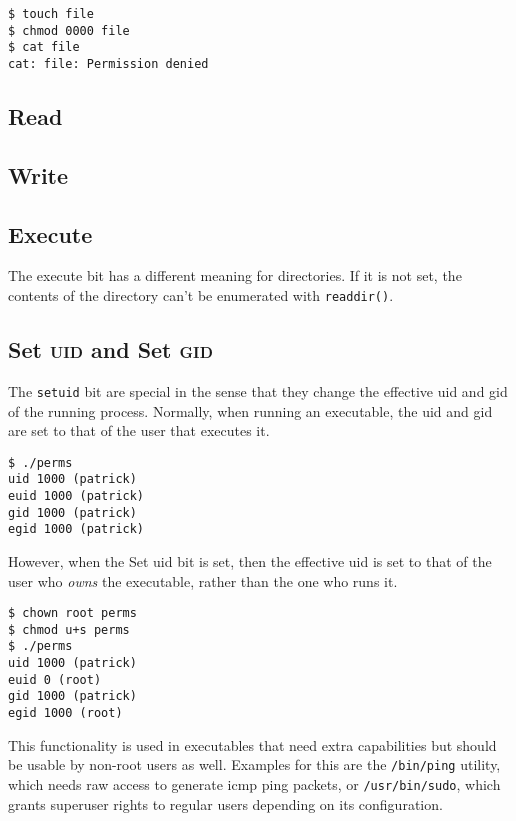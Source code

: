 \documentclass[a4paper]{article}
\begin{document}
\begin{verbatim}
$ touch file
$ chmod 0000 file
$ cat file
cat: file: Permission denied
\end{verbatim}

\subsection{Read}

\subsection{Write}

\subsection{Execute}

The execute bit has a different meaning for directories. If it is not set, the contents of the directory can't be enumerated with \verb|readdir()|. 

\subsection{Set \textsc{uid} and Set \textsc{gid}}

The \verb|setuid| bit are special in the sense that they change the effective \gls{uid} and \gls{gid} of the running process. Normally, when running an executable, the \gls{uid} and \gls{gid} are set to that of the user that executes it.

\begin{verbatim}
$ ./perms
uid 1000 (patrick)
euid 1000 (patrick)
gid 1000 (patrick)
egid 1000 (patrick)  
\end{verbatim}

However, when the Set \gls{uid} bit is set, then the effective \gls{uid} is set to that of the user who \emph{owns} the executable, rather than the one who runs it.

\begin{verbatim}
$ chown root perms
$ chmod u+s perms
$ ./perms
uid 1000 (patrick)
euid 0 (root)
gid 1000 (patrick)
egid 1000 (root)  
\end{verbatim}
This functionality is used in executables that need extra capabilities but should be usable by non-root users as well. Examples for this are the \verb|/bin/ping| utility, which needs raw access to generate \gls{icmp} ping packets, or \verb|/usr/bin/sudo|, which grants superuser rights to regular users depending on its configuration.
\end{document}
